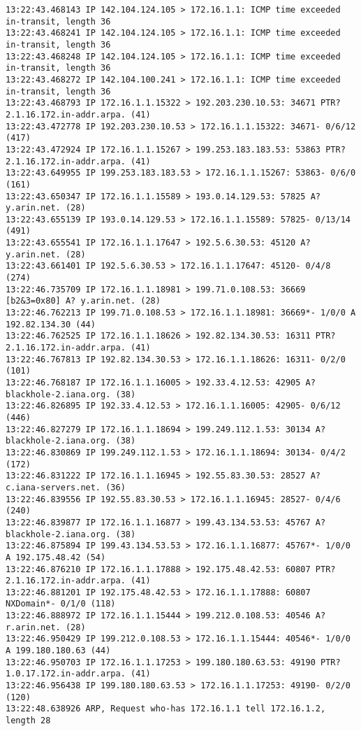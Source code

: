 \documentclass[
	letterpaper, %
	10pt, %
]{CSUniSchoolLabReport}
\begin{document}
\begin{center}
\begin{verbatim}
13:22:43.468143 IP 142.104.124.105 > 172.16.1.1: ICMP time exceeded in-transit, length 36
13:22:43.468241 IP 142.104.124.105 > 172.16.1.1: ICMP time exceeded in-transit, length 36
13:22:43.468248 IP 142.104.124.105 > 172.16.1.1: ICMP time exceeded in-transit, length 36
13:22:43.468272 IP 142.104.100.241 > 172.16.1.1: ICMP time exceeded in-transit, length 36
13:22:43.468793 IP 172.16.1.1.15322 > 192.203.230.10.53: 34671 PTR? 2.1.16.172.in-addr.arpa. (41)
13:22:43.472778 IP 192.203.230.10.53 > 172.16.1.1.15322: 34671- 0/6/12 (417)
13:22:43.472924 IP 172.16.1.1.15267 > 199.253.183.183.53: 53863 PTR? 2.1.16.172.in-addr.arpa. (41)
13:22:43.649955 IP 199.253.183.183.53 > 172.16.1.1.15267: 53863- 0/6/0 (161)
13:22:43.650347 IP 172.16.1.1.15589 > 193.0.14.129.53: 57825 A? y.arin.net. (28)
13:22:43.655139 IP 193.0.14.129.53 > 172.16.1.1.15589: 57825- 0/13/14 (491)
13:22:43.655541 IP 172.16.1.1.17647 > 192.5.6.30.53: 45120 A? y.arin.net. (28)
13:22:43.661401 IP 192.5.6.30.53 > 172.16.1.1.17647: 45120- 0/4/8 (274)
13:22:46.735709 IP 172.16.1.1.18981 > 199.71.0.108.53: 36669 [b2&3=0x80] A? y.arin.net. (28)
13:22:46.762213 IP 199.71.0.108.53 > 172.16.1.1.18981: 36669*- 1/0/0 A 192.82.134.30 (44)
13:22:46.762525 IP 172.16.1.1.18626 > 192.82.134.30.53: 16311 PTR? 2.1.16.172.in-addr.arpa. (41)
13:22:46.767813 IP 192.82.134.30.53 > 172.16.1.1.18626: 16311- 0/2/0 (101)
13:22:46.768187 IP 172.16.1.1.16005 > 192.33.4.12.53: 42905 A? blackhole-2.iana.org. (38)
13:22:46.826895 IP 192.33.4.12.53 > 172.16.1.1.16005: 42905- 0/6/12 (446)
13:22:46.827279 IP 172.16.1.1.18694 > 199.249.112.1.53: 30134 A? blackhole-2.iana.org. (38)
13:22:46.830869 IP 199.249.112.1.53 > 172.16.1.1.18694: 30134- 0/4/2 (172)
13:22:46.831222 IP 172.16.1.1.16945 > 192.55.83.30.53: 28527 A? c.iana-servers.net. (36)
13:22:46.839556 IP 192.55.83.30.53 > 172.16.1.1.16945: 28527- 0/4/6 (240)
13:22:46.839877 IP 172.16.1.1.16877 > 199.43.134.53.53: 45767 A? blackhole-2.iana.org. (38)
13:22:46.875894 IP 199.43.134.53.53 > 172.16.1.1.16877: 45767*- 1/0/0 A 192.175.48.42 (54)
13:22:46.876210 IP 172.16.1.1.17888 > 192.175.48.42.53: 60807 PTR? 2.1.16.172.in-addr.arpa. (41)
13:22:46.881201 IP 192.175.48.42.53 > 172.16.1.1.17888: 60807 NXDomain*- 0/1/0 (118)
13:22:46.888972 IP 172.16.1.1.15444 > 199.212.0.108.53: 40546 A? r.arin.net. (28)
13:22:46.950429 IP 199.212.0.108.53 > 172.16.1.1.15444: 40546*- 1/0/0 A 199.180.180.63 (44)
13:22:46.950703 IP 172.16.1.1.17253 > 199.180.180.63.53: 49190 PTR? 1.0.17.172.in-addr.arpa. (41)
13:22:46.956438 IP 199.180.180.63.53 > 172.16.1.1.17253: 49190- 0/2/0 (120)
13:22:48.638926 ARP, Request who-has 172.16.1.1 tell 172.16.1.2, length 28

\end{verbatim}
\end{center}
\end{document}
